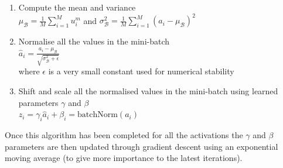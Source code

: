 {{\begin{enumerate}
    \item Compute the mean and variance\\
    $\mu_\mathcal{B} = \frac{1}{M} \sum_{i=1}^{M} u_i^m$ 
    \+ \+ \+ and \+ \+ \+
    $\sigma_\mathcal{B}^2 = \frac{1}{M}\sum_{i=1}^M (a_i - \mu_\mathcal{B})^2$
    \item Normalise all the values in the mini-batch\\
    $\hat a_i = \frac{a_i - \mu_\mathcal{B}}{\sqrt{\sigma_\mathcal{B}^2 + \epsilon}}$\\
    where $\epsilon$ is a very small constant used for numerical stability
    \item Shift and scale all the normalised values in the mini-batch using learned parameters $\gamma$ and $\beta$\\
    $z_i = \gamma_i \hat a_i + \beta_i = \text{batchNorm}(a_i)$
\end{enumerate}

Once this algorithm has been completed for all the activations the $\gamma$ and $\beta$ parameters are then updated through gradient descent using an exponential moving average (to give more importance to the latest iterations).

}}

